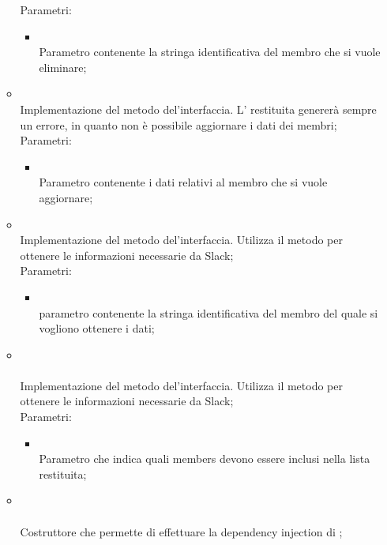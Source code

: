 \begin{itemize}
\begin{itemize}
		Parametri:
		\begin{itemize}
			\item {} \\
			Parametro contenente la stringa identificativa del membro che si vuole eliminare;
		\end{itemize}
		\item[]  \\		Implementazione del metodo del'interfaccia. L' restituita genererà sempre un errore, in quanto non è possibile aggiornare i dati dei membri;\\
		Parametri:
		\begin{itemize}
			\item {} \\
			Parametro contenente i dati relativi al membro che si vuole aggiornare;
		\end{itemize}
		\item[]  \\		Implementazione del metodo del'interfaccia. Utilizza il metodo  per ottenere le informazioni necessarie da Slack;\\
		Parametri:
		\begin{itemize}
			\item {} \\
			parametro contenente la stringa identificativa del membro del quale si vogliono ottenere i dati;
		\end{itemize}
		\item[] \\ \\		Implementazione del metodo del'interfaccia. Utilizza il metodo  per ottenere le informazioni necessarie da Slack;\\
		Parametri:
		\begin{itemize}
			\item {} \\
			Parametro che indica quali members devono essere inclusi nella lista restituita;
		\end{itemize}
		\item[] \\ \\		Costruttore che permette di effettuare la dependency injection di ;\\

\end{itemize}
\end{itemize}
